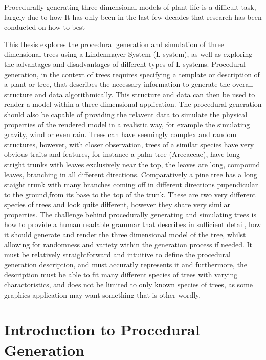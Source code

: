 \begin{flushleft}

Procedurally generating three dimensional models of plant-life is a difficult task, largely due to how It has only been in the last few decades that research has been conducted on how to best 

This thesis explores the procedural generation and simulation of three dimensional trees using a Lindenmayer System (L-system), as well as exploring the advantages and disadvantages of different types of L-systems. Procedural generation, in the context of  trees requires specifying a template or description of a plant or tree, that describes the necessary information to generate the overall structure and data algorithmically. This structure and data can then be used to render a model within a three dimensional application. The procedural generation should also be capable of providing the relavent data to simulate the physical properties of the rendered model in a realistic way, for example the simulating gravity, wind or even rain. Trees can have seemingly complex and random structures, however, with closer observation, trees of a similar species have very obvious traits and features, for instance a palm tree (Arecaceae), have long stright trunks with leaves exclusively near the top, the leaves are long, compound leaves, branching in all different directions. Comparatively a pine tree has a long staight trunk with many branches coming off in different directions pupendicular to the ground,from its base to the top of the trunk. These are two very different species of trees and look quite different, however they share very similar properties. The challenge behind procedurally generating and simulating trees is how to provide a human readable grammar that describes in sufficient detail, how it should generate and render the three dimensional model of the tree, whilst allowing for randomness and variety within the generation process if needed. It must be relatively straightforward and intuitive to define the procedural generation description, and must accuratly represents it and furthermore, the description must be able to fit many different species of trees with varying charactoristics, and does not be limited to only known species of trees, as some graphics application may want something that is other-wordly. \\

\end{flushleft}

\section{Introduction to Procedural Generation}

